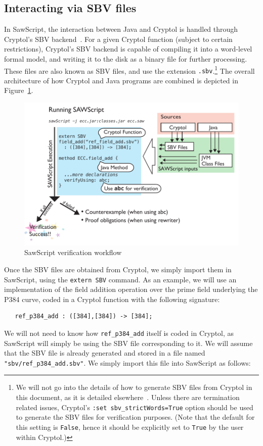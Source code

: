 \documentclass[12pt]{galois-whitepaper}
\newcommand{\sawScript}{{\sc SawScript}\xspace}
\begin{document}
\subsection{Interacting via SBV files}
In \sawScript, the interaction between Java and Cryptol is handled through Cryptol's SBV backend~\cite{Cryptol, CryptolSBV}. For a given
Cryptol function (subject to certain restrictions), Cryptol's SBV backend is capable of compiling it into a word-level formal model, and
writing it to the disk as a binary file for further processing. These files are also known as SBV files, and use the extension {\tt .sbv}.\footnote{
We will not go into the details of how to generate SBV files from Cryptol in this document, as it is detailed elsewhere~\cite{CryptolSBV}.
Unless there are termination related issues, Cryptol's {\tt :set sbv\_strictWords=True} option should be used to generate the
SBV files for verification purposes. (Note that the default for this setting is {\tt False}, hence it should be explicitly set to {\tt True}
by the user within Cryptol.)}
The overall architecture of how Cryptol and Java programs are combined is depicted in Figure~\ref{fig:sawScriptExecution}.

\begin{figure}[ht]
\begin{center}
  \includegraphics{figures/sawScriptExecution.pdf}
  \caption{\label{fig:sawScriptExecution} \sawScript verification workflow}
\end{center}
\end{figure}

Once the SBV files are obtained from Cryptol, we simply import them in \sawScript, using the {\tt extern SBV} command. As an example, we will
use an implementation of the field addition operation over the prime field underlying the P384 curve, coded in a Cryptol function with the following signature:
\begin{Verbatim}
   ref_p384_add : ([384],[384]) -> [384];
\end{Verbatim}
We will not need to know how {\tt ref\_p384\_add} itself is coded in Cryptol, as \sawScript will simply be using the SBV file corresponding to it.
We will assume that the SBV file is already generated and stored in a file named {\tt "sbv/ref\_p384\_add.sbv"}. We simply import
this file into \sawScript as follows:
\end{document}

